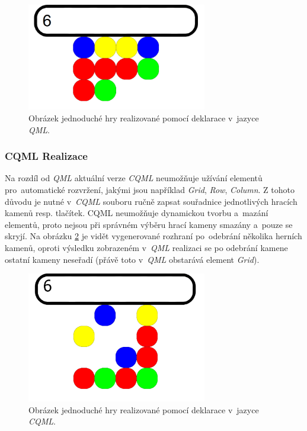 \documentclass[11pt,twoside,a4paper]{book}
\begin{document}
\begin{figure}[!ht]
\begin{center}
  \includegraphics[width=0.7\textwidth]{figures/qmlGame}
\caption{{\label{fig:outGameQML}}Obrázek jednoduché hry realizované pomocí deklarace v~jazyce \textit{QML}.}
\end{center}
\end{figure}

\subsubsection{CQML Realizace}
Na rozdíl od \textit{QML} aktuální verze \textit{CQML} neumožňuje užívání elementů pro~automatické rozvržení, jakými jsou například \textit{Grid}, \textit{Row}, \textit{Column}. Z tohoto důvodu je nutné v~\textit{CQML} souboru ručně zapsat souřadnice jednotlivých hracích kamenů resp. tlačítek.
CQML neumožňuje dynamickou tvorbu a~mazání elementů, proto nejsou při správném výběru hrací kameny smazány a~pouze se skryjí.
Na obrázku \ref{fig:outGameCQML} je vidět vygenerované rozhraní po~odebrání několika herních kamenů, oproti výsledku zobrazeném v~\textit{QML} realizaci se po odebrání kamene ostatní kameny neseřadí (přávě toto v~\textit{QML} obstarává element \textit{Grid}).
\begin{figure}[!ht]
\begin{center}
  \includegraphics[width=0.7\textwidth]{figures/cqmlGame}
\caption{{\label{fig:outGameCQML}}Obrázek jednoduché hry realizované pomocí deklarace v~jazyce \textit{CQML}.}
\end{center}
\end{figure}
\end{document}
